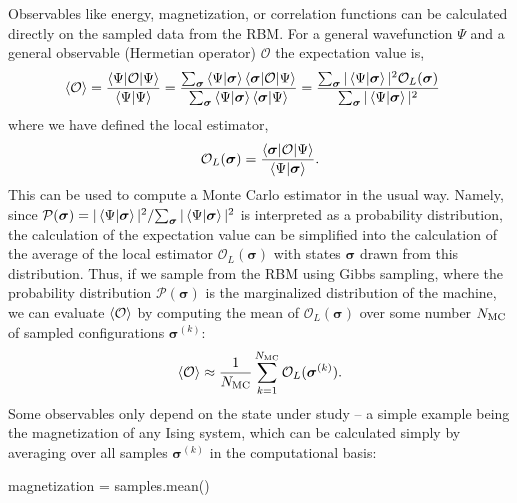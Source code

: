 \documentclass[submission, Phys]{SciPost}
\begin{document}
Observables like energy, magnetization, or correlation functions can be calculated directly on the sampled data from the RBM.
For a general wavefunction $\Psi$ and a general observable (Hermetian operator) $\mathcal{O}$ the expectation value is,
\begin{align}
	\braket{\mathcal{O}} & = \frac{\braket{\Psi | \mathcal{O} | \Psi}}{\braket{\Psi | \Psi}} = \frac{\sum_{\bm{\sigma}} \braket{\Psi | {\bm{\sigma}}} \braket{{\bm{\sigma}} | \mathcal{O} | \Psi}}{\sum_{\bm{\sigma}} \braket{\Psi | {\bm{\sigma}}} \braket{{\bm{\sigma}} | \Psi}} 
	    = \frac{\sum_{\bm{\sigma}} | \braket{\Psi | {\bm{\sigma}}} |^2 \mathcal{O}_L({\bm{\sigma}}) }{\sum_{\bm{\sigma}} | \braket{\Psi | {\bm{\sigma}}} |^2}
\end{align}
where we have defined the local estimator,
\begin{equation}
	\mathcal{O}_L({\bm{\sigma}}) = \frac{\braket{{\bm{\sigma}} | \mathcal{O} | \Psi}}{\braket{\Psi | {\bm{\sigma}}}} .
\end{equation}
This can be used to compute a Monte Carlo estimator in the usual way.  Namely, since 
$ \mathcal{P}({\bm{\sigma}}) = { | \braket{\Psi | {\bm{\sigma}}} |^2 }/{\sum_{\bm{\sigma}} | \braket{\Psi | {\bm{\sigma}}} |^2}$
is interpreted as a probability distribution,
the calculation of the expectation value can be simplified into the calculation of the average 
of the local estimator $\mathcal{O}_L({\bm{\sigma}})$ with states ${\bm \sigma}$ drawn from this distribution.
Thus, if we sample from the RBM using Gibbs sampling, where the probability distribution $\mathcal{P}({\bm{\sigma}})$ is the  
marginalized distribution of the machine,
we can evaluate $\braket{\mathcal{O}}$ by computing the mean of $\mathcal{O}_L({\bm{\sigma}})$ over 
some number $N_{\rm MC}$ of sampled configurations ${\bm{\sigma}^{(k)}}$:
\begin{align}
	\label{Eq:}
	\mathcal{\langle O \rangle} \approx \frac{1}{N_{\rm MC}} \sum_{k=1}^{N_{\rm MC}} \mathcal{O}_L({\bm{\sigma}}^{(k)}).
\end{align}
Some observables only depend on the state under study -- a simple example being the magnetization of any Ising 
system, which can be calculated simply by averaging over all samples $\bm{\sigma}^{(k)}$ in the computational basis:
\begin{python}
	magnetization = samples.mean()
\end{python}
\end{document}
